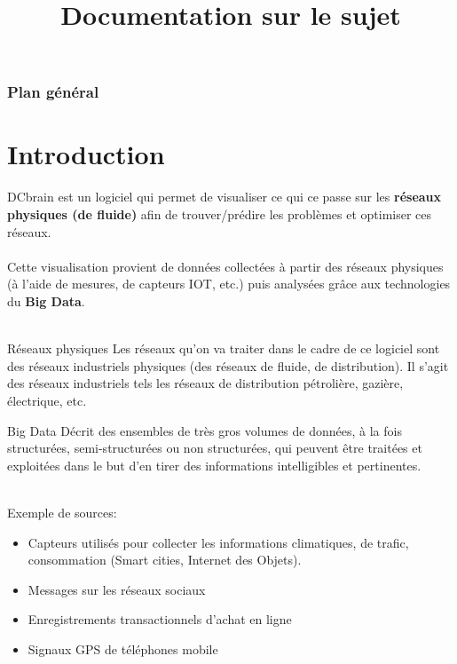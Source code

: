 
\usepackage{../tex/myInfolines}
\title{Documentation sur le sujet}



	\begin{frame}
		\titlepage
	\end{frame}
	
	\begin{frame}
		\frametitle{Plan général}
		\tableofcontents
	\end{frame}
	
	\section{Introduction}
	\begin{frame}
		DCbrain est un logiciel qui permet de visualiser ce qui ce passe sur les \textbf{réseaux physiques (de fluide)} afin de trouver/prédire les problèmes et optimiser ces réseaux.\\~\\
		\pause
		Cette visualisation provient de données collectées à partir des réseaux physiques (à l'aide de mesures, de capteurs IOT, etc.) puis analysées grâce aux technologies du \textbf{Big Data}.\\~\\
		\pause
		\begin{block}{Réseaux physiques}
		Les réseaux qu'on va traiter dans le cadre de ce logiciel sont des réseaux industriels physiques (des réseaux de fluide, de distribution). Il s'agit des réseaux industriels tels les réseaux de distribution pétrolière, gazière, électrique, etc.
		\end{block}
	\end{frame}
	
	\begin{frame} 
		\begin{block}{Big Data}
		Décrit des ensembles de très gros volumes de données, à la fois structurées, semi-structurées ou non structurées, qui peuvent être traitées et exploitées dans le but d’en tirer des informations intelligibles et pertinentes.
		\end{block}
		\pause
		~\\
		Exemple de sources: 
		\begin{itemize}
			\pause\item Capteurs utilisés pour collecter les informations climatiques, de trafic, consommation (Smart cities, Internet des Objets).
			\pause\item Messages sur les réseaux sociaux 
			\pause\item Enregistrements transactionnels d’achat en ligne 
			\pause\item Signaux GPS de téléphones mobile
		\end{itemize}
	\end{frame}
	

